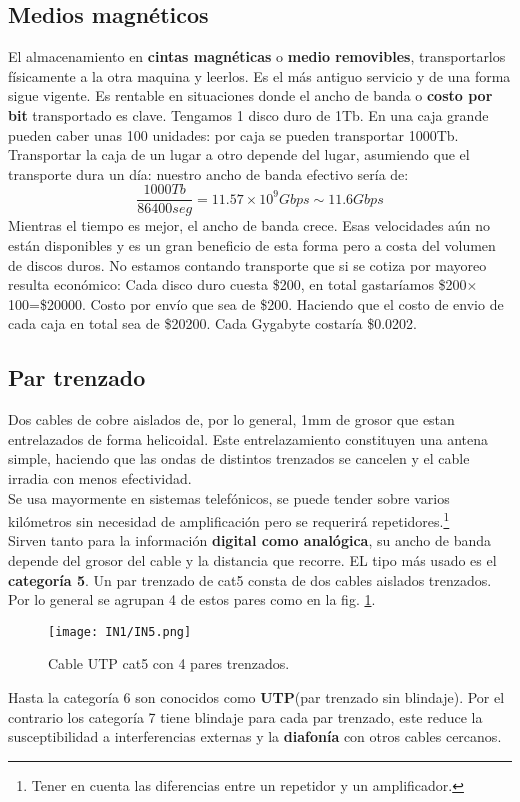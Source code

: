 \documentclass[
	12pt, %
	fleqn, %
	a4paper, %
]{LegrandOrangeBook}
\begin{document}
\subsection{Medios magnéticos}
El almacenamiento en \textbf{cintas magnéticas} o \textbf{medio removibles}, transportarlos físicamente a la otra maquina y leerlos. Es el más antiguo servicio y de una forma sigue vigente. Es rentable en situaciones donde el ancho de banda o \textbf{costo por bit} transportado es clave. Tengamos 1 disco duro de 1Tb. En una caja grande pueden caber unas 100 unidades: por caja se pueden transportar 1000Tb. Transportar la caja de un lugar a otro depende del lugar, asumiendo que el transporte dura un día: nuestro ancho de banda efectivo sería de:
\begin{displaymath}
\frac{1000Tb}{86400seg}=11.57\times 10^9 Gbps\sim 11.6 Gbps
\end{displaymath}
Mientras el tiempo es mejor, el ancho de banda crece. Esas velocidades aún no están disponibles y es un gran beneficio de esta forma pero a costa del volumen de discos duros. No estamos contando transporte que si se cotiza por mayoreo resulta económico: Cada disco duro cuesta \$200, en total gastaríamos \$200$\times$100=\$20000. Costo por envío que sea de \$200. Haciendo que el costo de envio de cada caja en total sea de \$20200. Cada Gygabyte costaría \$0.0202.
\subsection{Par trenzado}
Dos cables de cobre aislados de, por lo general, 1mm de grosor que estan entrelazados de forma helicoidal. Este entrelazamiento constituyen una antena simple, haciendo que las ondas de distintos trenzados se cancelen y el cable irradia con menos efectividad.\\
Se usa mayormente en sistemas telefónicos, se puede tender sobre varios kilómetros sin necesidad de amplificación pero se requerirá repetidores.\footnote{Tener en cuenta las diferencias entre un repetidor y un amplificador.}\\
Sirven tanto para la información \textbf{digital como analógica}, su ancho de banda depende del grosor del cable y la distancia que recorre. EL tipo más usado es el \textbf{categoría 5}. Un par trenzado de cat5 consta de dos cables aislados trenzados. Por lo general se agrupan 4 de estos pares como en la fig. \ref{fig:utp cat 5}.
\begin{figure}[H]
\centering
\texttt{[image: IN1/IN5.png]}
\caption{Cable UTP cat5 con 4 pares trenzados.}
\label{fig:utp cat 5}
\end{figure}
Hasta la categoría 6 son conocidos como \textbf{UTP}(par trenzado sin blindaje). Por el contrario los categoría 7 tiene blindaje para cada par trenzado, este reduce la susceptibilidad a interferencias externas y la \textbf{diafonía} con otros cables cercanos.
\end{document}
